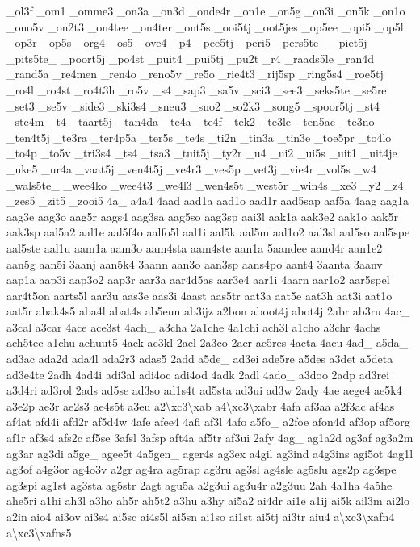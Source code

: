 \begin{DoxyCompactItemize}
\-\_\-ol3f \-\_\-om1 \-\_\-omme3 \-\_\-on3a \-\_\-on3d \-\_\-onde4r \-\_\-on1e \-\_\-on5g \-\_\-on3i \-\_\-on5k \-\_\-on1o \-\_\-ono5v \-\_\-on2t3 \-\_\-on4tee \-\_\-on4ter \-\_\-ont5s \-\_\-ooi5tj \-\_\-oot5jes \-\_\-op5ee \-\_\-opi5 \-\_\-op5l \-\_\-op3r \-\_\-op5s \-\_\-org4 \-\_\-os5 \-\_\-ove4 \-\_\-p4 \-\_\-pee5tj \-\_\-peri5 \-\_\-pers5te\-\_\- \-\_\-piet5j \-\_\-pits5te\-\_\- \-\_\-poort5j \-\_\-po4st \-\_\-puit4 \-\_\-pui5tj \-\_\-pu2t \-\_\-r4 \-\_\-raads5le \-\_\-ran4d \-\_\-rand5a \-\_\-re4men \-\_\-ren4o \-\_\-reno5v \-\_\-re5o \-\_\-rie4t3 \-\_\-rij5sp \-\_\-ring5s4 \-\_\-roe5tj \-\_\-ro4l \-\_\-ro4st \-\_\-ro4t3h \-\_\-ro5v \-\_\-s4 \-\_\-sap3 \-\_\-sa5v \-\_\-sci3 \-\_\-see3 \-\_\-seks5te \-\_\-se5re \-\_\-set3 \-\_\-se5v \-\_\-side3 \-\_\-ski3s4 \-\_\-sneu3 \-\_\-sno2 \-\_\-so2k3 \-\_\-song5 \-\_\-spoor5tj \-\_\-st4 \-\_\-ste4m \-\_\-t4 \-\_\-taart5j \-\_\-tan4da \-\_\-te4a \-\_\-te4f \-\_\-tek2 \-\_\-te3le \-\_\-ten5ac \-\_\-te3no \-\_\-ten4t5j \-\_\-te3ra \-\_\-ter4p5a \-\_\-ter5s \-\_\-te4s \-\_\-ti2n \-\_\-tin3a \-\_\-tin3e \-\_\-toe5pr \-\_\-to4lo \-\_\-to4p \-\_\-to5v \-\_\-tri3s4 \-\_\-ts4 \-\_\-tsa3 \-\_\-tuit5j \-\_\-ty2r \-\_\-u4 \-\_\-ui2 \-\_\-ui5s \-\_\-uit1 \-\_\-uit4je \-\_\-uke5 \-\_\-ur4a \-\_\-vaat5j \-\_\-ven4t5j \-\_\-ve4r3 \-\_\-ves5p \-\_\-vet3j \-\_\-vie4r \-\_\-vol5s \-\_\-w4 \-\_\-wals5te\-\_\- \-\_\-wee4ko \-\_\-wee4t3 \-\_\-we4l3 \-\_\-wen4s5t \-\_\-west5r \-\_\-win4s \-\_\-xe3 \-\_\-y2 \-\_\-z4 \-\_\-zes5 \-\_\-zit5 \-\_\-zooi5 4a\-\_\- a4a4 4aad aad1a aad1o aad1r aad5sap aaf5a 4aag aag1a aag3e aag3o aag5r aags4 aag3sa aag5so aag3sp aai3l aak1a aak3e2 aak1o aak5r aak3sp aal5a2 aal1e aal5f4o aalfo5l aal1i aal5k aal5m aal1o2 aal3sl aal5so aal5spe aal5ste aal1u aam1a aam3o aam4sta aam4ste aan1a 5aandee aand4r aan1e2 aan5g aan5i 3aanj aan5k4 3aann aan3o aan3sp aans4po aant4 3aanta 3aanv aap1a aap3i aap3o2 aap3r aar3a aar4d5as aar3e4 aar1i 4aarn aar1o2 aar5spel aar4t5on aarts5l aar3u aas3e aas3i 4aast aas5tr aat3a aat5e aat3h aat3i aat1o aat5r abak4s5 aba4l abat4s ab5eun ab3ijz a2bon aboot4j abot4j 2abr ab3ru 4ac\-\_\- a3cal a3car 4ace ace3st 4ach\-\_\- a3cha 2a1che 4a1chi ach3l a1cho a3chr 4achs ach5tec a1chu achuut5 4ack ac3kl 2acl 2a3co 2acr ac5res 4acta 4acu 4ad\-\_\- a5da\-\_\- ad3ac ada2d ada4l ada2r3 adas5 2add a5de\-\_\- ad3ei ade5re a5des a3det a5deta ad3e4te 2adh 4ad4i adi3al adi4oc adi4od 4adk 2adl 4ado\-\_\- a3doo 2adp ad3rei a3d4ri ad3rol 2ads ad5se ad3so ad1s4t ad5sta ad3ui ad3w 2ady 4ae aege4 ae5k4 a3e2p ae3r ae2s3 ae4s5t a3eu a2\textbackslash{}xc3\textbackslash{}xab a4\textbackslash{}xc3\textbackslash{}xabr 4afa af3aa a2f3ac af4as af4at afd4i afd2r af5d4w 4afe afee4 4afi af3l 4afo a5fo\-\_\- a2foe afon4d af3op af5org af1r af3s4 afs2c af5se 3afsl 3afsp aft4a af5tr af3ui 2afy 4ag\-\_\- ag1a2d ag3af ag3a2m ag3ar ag3di a5ge\-\_\- agee5t 4a5gen\-\_\- ager4s ag3ex a4gil ag3ind a4g3ins agi5ot 4ag1l ag3of a4g3or ag4o3v a2gr ag4ra ag5rap ag3ru ag3sl ag4sle ag5slu ags2p ag3spe ag3spi ag1st ag3sta ag5str 2agt agu5a a2g3ui ag3u4r a2g3uu 2ah 4a1ha 4a5he ahe5ri a1hi ah3l a3ho ah5r ah5t2 a3hu a3hy ai5a2 ai4dr ai1e a1ij ai5k ail3m ai2lo a2in aio4 ai3ov ai3s4 ai5sc ai4s5l ai5sn ai1so ai1st ai5tj ai3tr aiu4 a\textbackslash{}xc3\textbackslash{}xafn4 a\textbackslash{}xc3\textbackslash{}xafns5 
\end{DoxyCompactItemize}
